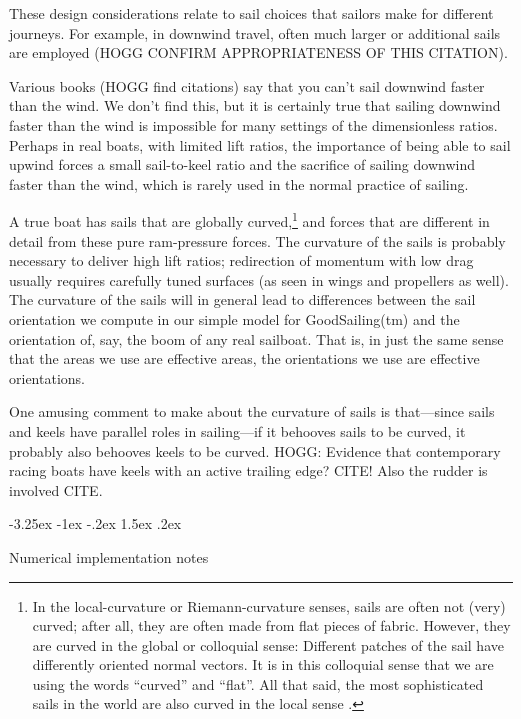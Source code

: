 \documentclass[letterpaper]{article}
\makeatletter
\renewcommand\section{\@startsection {section}{1}{\z@}%
  {-3.25ex \@plus -1ex \@minus -.2ex}%
  {1.5ex \@plus .2ex}%
  {\raggedright\normalfont\large\bfseries}}
\makeatother
\begin{document}
These design considerations relate to sail choices that sailors make for different journeys.
For example, in downwind travel, often much larger or additional sails are employed \cite{sails} (HOGG CONFIRM APPROPRIATENESS OF THIS CITATION).

Various books (HOGG find citations) say that you can't sail downwind faster than the wind.
We don't find this, but it is certainly true that sailing downwind faster than the wind is impossible for many settings of the dimensionless ratios.
Perhaps in real boats, with limited lift ratios, the importance of being able to sail upwind forces a small sail-to-keel ratio and the sacrifice of sailing downwind faster than the wind, which is rarely used in the normal practice of sailing.

A true boat has sails that are globally curved,\footnote{%
In the local-curvature or Riemann-curvature senses, sails are often not (very) curved; after all, they are often made from flat pieces of fabric.
However, they are curved in the global or colloquial sense: Different patches of the sail have differently oriented normal vectors.
It is in this colloquial sense that we are using the words ``curved'' and ``flat''.
All that said, the most sophisticated sails in the world are also curved in the local sense \cite{sails}.}
and forces that are different in detail from these pure ram-pressure forces.
The curvature of the sails is probably necessary to deliver high lift ratios; redirection of momentum with low drag usually requires carefully tuned surfaces (as seen in wings and propellers as well).
The curvature of the sails will in general lead to differences between the sail orientation we compute in our simple model for GoodSailing(tm) and the orientation of, say, the boom of any real sailboat.
That is, in just the same sense that the areas we use are effective areas, the orientations we use are effective orientations.

One amusing comment to make about the curvature of sails is that---since sails and keels have parallel roles in sailing---if it behooves sails to be curved, it probably also behooves keels to be curved.
HOGG: Evidence that contemporary racing boats have keels with an active trailing edge? CITE! Also the rudder is involved CITE.

\section{Numerical implementation notes}\label{sec:implementation}
\end{document}
